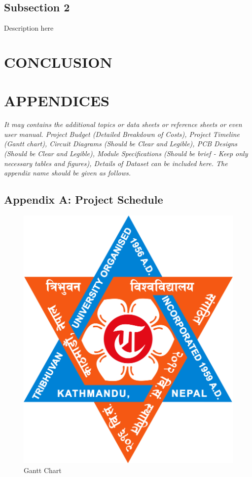 \documentclass{ioereport}
\begin{document}
    \subsection{Subsection 2}
        Description here

    \pagebreak

\section{\MakeUppercase{Conclusion}}
    \lipsum[2]

    \pagebreak
    
\section{\MakeUppercase{Appendices}} \label{sec:appendices}
    \textit{It may contains the additional topics or data sheets or reference sheets or even user manual. Project Budget (Detailed Breakdown of Costs), Project Timeline (Gantt chart), Circuit Diagrams (Should be Clear and Legible), PCB Designs (Should be Clear and Legible), Module Specifications (Should be brief - Keep only necessary tables and figures), Details of Dataset can be included here. The appendix name should be given as follows.}
    
    \subsection*{Appendix A: Project Schedule}
    \begin{figure}[H]
        \centering
        \includegraphics[angle=90, origin=c, height=0.4\textheight]{TU_Logo.jpg}
        \caption{Gantt Chart}
        \label{fig:gantt}
    \end{figure}
    
\end{document}
